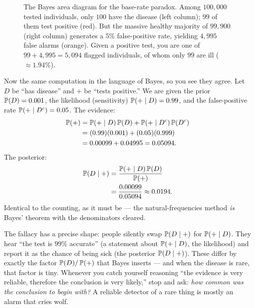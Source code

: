 \begin{figure}[H]
\caption{The Bayes area diagram for the base-rate paradox. Among $100{,}000$ tested individuals, only $100$ have the disease (left column); $99$ of them test positive (red). But the massive healthy majority of $99{,}900$ (right column) generates a $5\%$ false-positive rate, yielding $4{,}995$ false alarms (orange). Given a positive test, you are one of $99 + 4{,}995 = 5{,}094$ flagged individuals, of whom only $99$ are ill ($\approx 1.94\%$).}
\label{ch05:fig-bayes-area}
\end{figure}

Now the same computation in the language of Bayes, so you see they agree. Let $D$ be
``has disease'' and $+$ be ``tests positive.'' We are given the prior $\P(D) = 0.001$,
the likelihood (sensitivity) $\P(+ \given D) = 0.99$, and the false-positive rate
$\P(+ \given D^c) = 0.05$. The evidence:
\begin{align*}
\P(+) &= \P(+\given D)\P(D) + \P(+\given D^c)\P(D^c) \\
        &= (0.99)(0.001) + (0.05)(0.999) \\
        &= 0.00099 + 0.04995 = 0.05094.
\end{align*}
The posterior:
\begin{align*}
  \P(D \given +) &= \frac{\P(+\given D)\P(D)}{\P(+)} \\
                 &= \frac{0.00099}{0.05094} \approx 0.0194.
\end{align*}
Identical to the counting, as it must be --- the natural-frequencies method \emph{is}
Bayes' theorem with the denominators cleared.

\begin{trapbox}
The fallacy has a precise shape: people silently swap $\P(D \given +)$ for
$\P(+ \given D)$. They hear ``the test is $99\%$ accurate'' (a statement about
$\P(+\given D)$, the likelihood) and report it as the chance of being sick (the
posterior $\P(D\given +)$). These differ by exactly the factor $\P(D)/\P(+)$ that Bayes
inserts --- and when the disease is rare, that factor is tiny. Whenever you catch
yourself reasoning ``the evidence is very reliable, therefore the conclusion is very
likely,'' stop and ask: \emph{how common was the conclusion to begin with?} A reliable
detector of a rare thing is mostly an alarm that cries wolf.
\end{trapbox}

